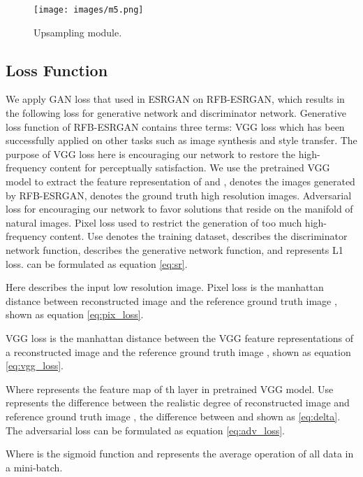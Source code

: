 \documentclass[10pt,twocolumn,letterpaper]{article}
\begin{document}
\begin{figure}[htbp]
\centering 
\texttt{[image: images/m5.png]}
\caption{Upsampling module.}
\label{fig:upsampling}
\end{figure}

\subsection{Loss Function} \label{sec:loss}
We apply GAN loss that used in ESRGAN \cite{wang2018esrgan} on RFB-ESRGAN, which results in the following loss for generative network and discriminator network. Generative loss function of RFB-ESRGAN contains three terms:  VGG loss which has been successfully applied on other tasks such as image synthesis and style transfer. The purpose of VGG loss here is encouraging our network to restore the high-frequency content for perceptually satisfaction. We use the pretrained VGG model to extract the feature representation of  and ,  denotes the images generated by RFB-ESRGAN,   denotes the ground truth high resolution images. Adversarial loss  for encouraging our network to favor solutions that reside on the manifold of natural images. Pixel loss  used to restrict the generation of too much high-frequency content. Use  denotes the training dataset,  describes the discriminator network function,  describes the generative network function, and  represents L1 loss.  can be formulated as equation \eqref{eq:sr}.


Here  describes the input low resolution image. Pixel loss is the manhattan distance between reconstructed image  and the reference ground truth image , shown as equation \eqref{eq:pix_loss}.



VGG loss is the manhattan distance between the VGG feature representations of a reconstructed image  and the reference ground truth image , shown as equation \eqref{eq:vgg_loss}.



Where  represents the feature map of th layer in pretrained VGG model. Use  represents the difference between the realistic degree of reconstructed image  and reference ground truth image , the difference between  and  shown as \eqref{eq:delta}. The adversarial loss can be formulated as equation \eqref{eq:adv_loss}.

Where  is the sigmoid function and  represents the average operation of all data in a mini-batch.
\end{document}
